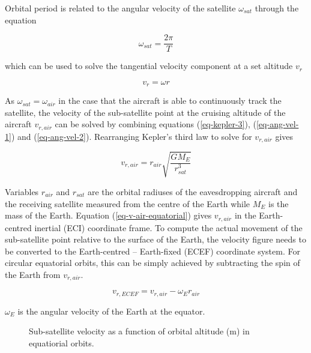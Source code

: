 \documentclass[english, 12pt, a4paper, elec, utf8, a-1b, online]{aaltothesis}
\begin{document}
Orbital period is related to the angular velocity of the satellite $\omega_{sat}$ through the equation

\begin{equation} \label{eq-ang-vel-1}
  \omega_{sat} = \frac{2\pi}{T}
\end{equation}

\noindent
which can be used to solve the tangential velocity component at a set altitude $v_r$

\begin{equation} \label{eq-ang-vel-2}
  v_r = \omega r
\end{equation}

\noindent
As $\omega_{sat} = \omega_{air}$ in the case that the aircraft is able to continuously track the satellite, the velocity of the sub-satellite point at the cruising altitude of the aircraft $v_{r, air}$ can be solved by combining equations (\ref{eq-kepler-3}), (\ref{eq-ang-vel-1}) and (\ref{eq-ang-vel-2}).
Rearranging Kepler's third law to solve for $v_{r, air}$ gives

\begin{equation} \label{eq-v-air-equatorial}
  v_{r, air} = r_{air} \sqrt{\frac{G M_E}{r_{sat}^3}}
\end{equation}

\noindent
Variables $r_{air}$ and $r_{sat}$ are the orbital radiuses of the eavesdropping aircraft and the receiving satellite measured from the centre of the Earth while $M_E$ is the mass of the Earth.
Equation (\ref{eq-v-air-equatorial}) gives $v_{r, air}$ in the Earth-centred inertial (ECI) coordinate frame.
To compute the actual movement of the sub-satellite point relative to the surface of the Earth, the velocity figure needs to be converted to the Earth-centred -- Earth-fixed (ECEF) coordinate system.
For circular equatorial orbits, this can be simply achieved by subtracting the spin of the Earth from $v_{r, air}$.

\begin{equation}
  v_{r, ECEF} = v_{r, air} - \omega_E r_{air}
\end{equation}

\noindent
$\omega_E$ is the angular velocity of the Earth at the equator.

\begin{figure}[h]
  \centering
  
  \caption{Sub-satellite velocity as a function of orbital altitude (m) in equatiorial orbits.}
  \label{fig-subsat-velocity-equatiorial}
\end{figure}
\end{document}
